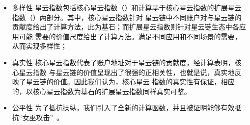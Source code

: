 \begin{itemize}
\item{多样性} 星云指数包括核心星云指数（\nrcore）和计算基于核心星云指数的扩展星云指数（\nrext）两部分。其中，核心星云指数针对
星云链中不同账户对与星云链的贡献度给出了计算方法，此为基石；而扩展星云指数则针对星云链生态中各应用可能
需要的价值尺度给出了计算方法。满足不同应用和不同场景的需要，从而实现多样性；
\item{真实性} 核心星云指数代表了账户地址对于星云链的贡献度，经计算表明，核心星云指数
与星云链的价值呈现出了很强的正相关性，也就是说，真实地反映了星云链的价值。因此我们认为，核心星云
指数的真实性有保证，相应的，以核心星云指数为基石的扩展星云指数同样真实可鉴。
\item{公平性} 为了抵抗操纵，我们引入了全新的计算函数，并且被证明能够有效抵抗“女巫攻击”~\cite{cheng2005sybilproof}。%
\end{itemize}


